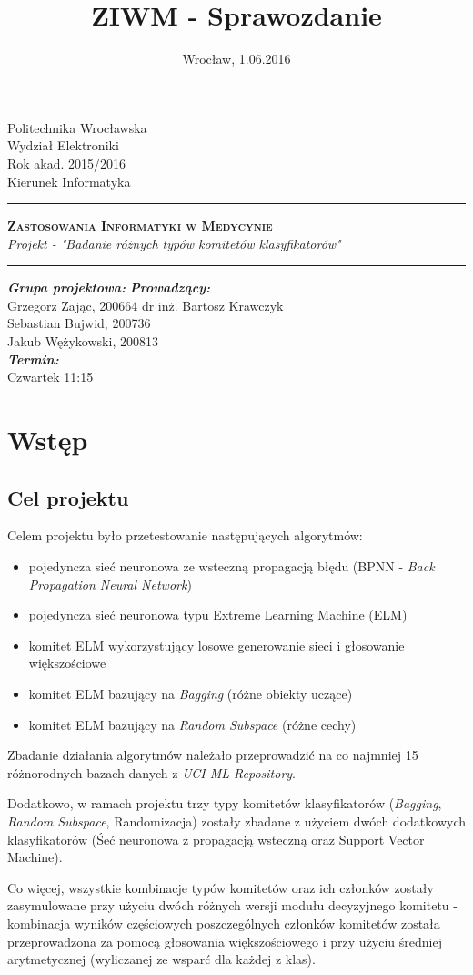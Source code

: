 \documentclass[11pt, a4paper, titlepage]{report}
\title{ZIWM - Sprawozdanie}
\date{Wrocław, 1.06.2016}
\makeatletter
\renewcommand{\maketitle}{\begin{titlepage}
		\begin{center}\small
			Politechnika Wrocławska\\
			Wydział Elektroniki\\
			Rok akad. 2015/2016\\
			Kierunek Informatyka\\
			\vspace{3cm}
			\rule{\linewidth}{0.4pt}
				\huge \textsc{\textbf{Zastosowania Informatyki w Medycynie}}
				\vspace{0.5cm} \\
				\normalsize \textit{Projekt - "Badanie różnych typów komitetów klasyfikatorów"}  
			\rule{\linewidth}{0.4pt}           
		\end{center}
		
		\vspace{3cm}
		\begin{flushleft}
			\textbf{\textit{Grupa projektowa:}} \hspace{8.0cm} \textbf{\textit{Prowadzący:}} \\
			Grzegorz Zając, 200664 \hfill{dr inż. Bartosz Krawczyk} \\	
            Sebastian Bujwid, 200736\\
            Jakub Wężykowski, 200813\\
			\vspace{0.5cm}
			\textbf{\textit{Termin:}}\\ Czwartek 11:15\\
			\vspace{2cm}		
		\end{flushleft}
		\vspace*{\stretch{6}}
		\begin{center}
			\@date
		\end{center}
	\end{titlepage}%
}
\makeatother
\begin{document}
\maketitle
\tableofcontents
\cleardoublepage
{}
{}


\chapter{Wstęp}
\section{Cel projektu}
Celem projektu było przetestowanie następujących algorytmów:

\begin{itemize}
\item pojedyncza sieć neuronowa ze wsteczną propagacją błędu (BPNN - \textit{Back Propagation Neural Network})
\item pojedyncza sieć neuronowa typu Extreme Learning Machine (ELM) \cite{ELM}
\item komitet ELM wykorzystujący losowe generowanie sieci i głosowanie większościowe \cite{ELM_Random}
\item komitet ELM bazujący na \textit{Bagging} (różne obiekty uczące)
\item komitet ELM bazujący na \textit{Random Subspace} (różne cechy)
\end{itemize}

Zbadanie działania algorytmów należało przeprowadzić na co najmniej 15 różnorodnych bazach danych z \textit{UCI ML Repository}\cite{UCI_ML_Repo}.

Dodatkowo, w ramach projektu trzy typy komitetów klasyfikatorów (\textit{Bagging}, \textit{Random Subspace}, Randomizacja) zostały zbadane z użyciem dwóch dodatkowych klasyfikatorów (Śeć neuronowa z propagacją wsteczną oraz Support Vector Machine). 

Co więcej, wszystkie kombinacje typów komitetów oraz ich członków zostały zasymulowane przy użyciu dwóch różnych wersji modułu decyzyjnego komitetu - kombinacja wyników częściowych poszczególnych członków komitetów została przeprowadzona za pomocą głosowania większościowego i przy użyciu średniej arytmetycznej (wyliczanej ze wsparć dla każdej z klas).
\end{document}
